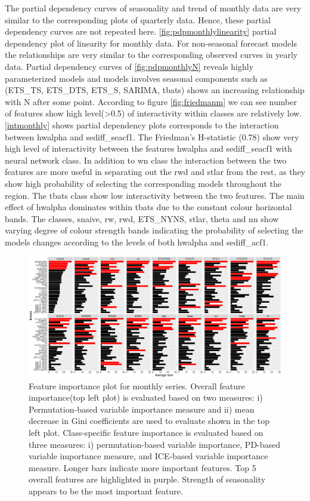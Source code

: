 \documentclass[11pt,a4paper,]{article}
\begin{document}
The partial dependency curves of seasonality and trend of monthly data are very similar to the corresponding plots of quarterly data. Hence, these partial dependency curves are not repeated here. \autoref{fig:pdpmonthlylinearity} partial dependency plot of linearity for monthly data. For non-seasonal forecast models the relationships are very similar to the corresponding observed curves in yearly data. Partial dependency curves of \autoref{fig:pdpmonthlyN} reveals highly parameterized models and models involves seasonal components such as (ETS\_TS, ETS\_DTS, ETS\_S, SARIMA, tbats) shows an increasing relationship with N after some point. According to figure \autoref{fig:friedmanm} we can see number of features show high level(\textgreater{}0.5) of interactivity within classes are relatively low. \autoref{intmonthly} shows partial dependency plots corresponds to the interaction between hwalpha and sediff\_seacf1. The Friedman's H-statistic (0.78) show very high level of interactivity between the features hwalpha and sediff\_seacf1 with neural network class. In addition to wn class the interaction between the two features are more useful in separating out the rwd and stlar from the rest, as they show high probability of selecting the corresponding models throughout the region. The tbats class show low interactivity between the two features. The main effect of hwalpha dominates within tbats due to the constant colour horizontal bands. The classes, snaive, rw, rwd, ETS\_NYNS, stlar, theta and nn show varying degree of colour strength bands indicating the probability of selecting the models changes according to the levels of both hwalpha and sediff\_acf1.

\begin{figure}
\centering
\includegraphics{figures/vimonthly-1.pdf}
\caption{\label{fig:vimonthly}Feature importance plot for monthly series. Overall feature importance(top left plot) is evaluated based on two measures: i) Permutation-based variable importance measure and ii) mean decrease in Gini coefficients are used to evaluate shown in the top left plot. Class-specific feature importance is evaluated based on three measures: i) permutation-based variable importance, PD-based variable importance measure, and ICE-based variable importance measure. Longer bars indicate more important features. Top 5 overall features are highlighted in purple. Strength of seasonality appears to be the most important feature.}
\end{figure}
\end{document}
